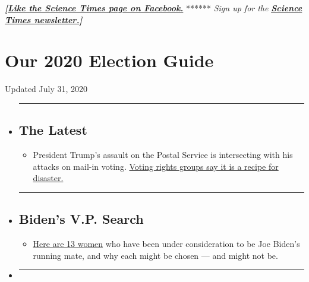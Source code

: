 \textbf{\emph{{[}}\href{http://on.fb.me/1paTQ1h}{\emph{Like the Science
Times page on Facebook.}}} ****** \emph{\textbar{} Sign up for the}
\textbf{\href{http://nyti.ms/1MbHaRU}{\emph{Science Times
newsletter.}}\emph{{]}}}

\hypertarget{our-2020-election-guide}{%
\section{Our 2020 Election Guide}\label{our-2020-election-guide}}

Updated July 31, 2020

\begin{itemize}
\item
  \begin{center}\rule{0.5\linewidth}{\linethickness}\end{center}

  \hypertarget{the-latest}{%
  \subsection{The Latest}\label{the-latest}}

  \begin{itemize}
  \tightlist
  \item
    President Trump's assault on the Postal Service is intersecting with
    his attacks on mail-in voting.
    \href{https://www.nytimes.com/2020/07/31/us/politics/trump-usps-mail-delays.html?action=click\&pgtype=Article\&state=default\&region=BELOW_MAIN_CONTENT\&context=storylines_guide}{Voting
    rights groups say it is a recipe for disaster.}
  \end{itemize}
\item
  \begin{center}\rule{0.5\linewidth}{\linethickness}\end{center}

  \hypertarget{bidens-vp-search}{%
  \subsection{Biden's V.P. Search}\label{bidens-vp-search}}

  \begin{itemize}
  \tightlist
  \item
    \href{https://www.nytimes.com/article/biden-vice-president-2020.html?action=click\&pgtype=Article\&state=default\&region=BELOW_MAIN_CONTENT\&context=storylines_guide}{Here
    are 13 women} who have been under consideration to be Joe Biden's
    running mate, and why each might be chosen --- and might not be.
  \end{itemize}
\item
  \begin{center}\rule{0.5\linewidth}{\linethickness}\end{center}


\end{itemize}
